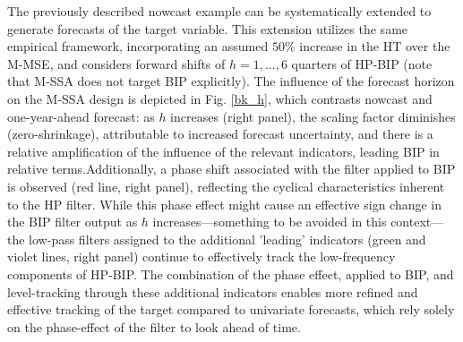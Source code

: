 \documentclass[a4paper]{article}
\begin{document}
The previously described nowcast example can be systematically extended to generate forecasts of the target variable. This extension utilizes the same empirical framework, incorporating an assumed $50\%$ increase in the HT over the M-MSE, and considers forward shifts of $h=1,...,6$  quarters of HP-BIP (note that M-SSA does not target BIP explicitly). %
The influence of the forecast horizon on the M-SSA design is depicted in Fig. \eqref{bk_h}, which contrasts nowcast and one-year-ahead forecast: as $h$ increases (right panel), the scaling factor diminishes (zero-shrinkage), attributable to increased forecast uncertainty, and there is a relative amplification of the influence of the relevant indicators, leading BIP in relative terms.Additionally, a phase shift associated with the filter applied to BIP is observed (red line, right panel), reflecting the cyclical characteristics inherent to the HP filter. While this phase effect might cause an effective sign change in the BIP filter output as $h$ increases—something to be avoided in this context—the low-pass filters assigned to the additional 'leading' indicators (green and violet lines, right panel) continue to effectively track the low-frequency components of HP-BIP. The combination of the phase effect, applied to BIP, and level-tracking through these additional indicators enables more refined and effective tracking of the target compared to univariate forecasts, which rely solely on the phase-effect of the filter to look ahead of time.\\
\end{document}
